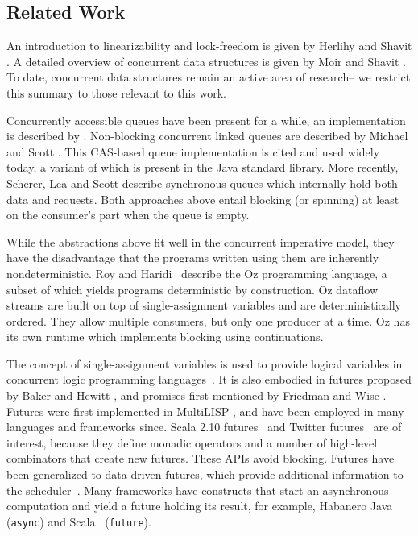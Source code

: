 \subsection{Related Work}

An introduction to linearizability and lock-freedom
is given by Herlihy and Shavit \cite{Herlihy08}.
A detailed overview of concurrent data structures is given
by Moir and Shavit \cite{Moir05}.
To date, concurrent data structures remain an active area of
research-- we restrict this summary to those relevant to this work.

Concurrently accessible queues have been present for a while,
an implementation is described by \cite{Mellor87}.
Non-blocking concurrent linked queues are described by Michael and
Scott \cite{Michael96}. This CAS-based
queue implementation is cited and used widely today, a variant of
which is present in the Java standard library.
More recently, Scherer, Lea and Scott \cite{SchererLS09} describe
synchronous queues which internally hold both data and requests.
Both approaches above entail blocking (or spinning) at least on the
consumer's part when the queue is empty.

While the abstractions above fit well in the concurrent imperative
model, they have the disadvantage that the programs written using them
are inherently nondeterministic.
Roy and Haridi~\cite{RoyH2004} describe the Oz programming language,
a subset of which yields programs deterministic by construction.
Oz dataflow streams are built on top of
single-assignment variables and are deterministically ordered.
They allow multiple consumers, but only one producer
at a time.
Oz has its own runtime which implements blocking using
continuations.

The concept of single-assignment variables is used to provide logical
variables in concurrent logic programming languages~\cite{Shapiro89}.
It is also embodied in
futures proposed by Baker and Hewitt \cite{Hewitt77}, and promises
first mentioned by Friedman and Wise \cite{Wise76}.
Futures were first implemented in MultiLISP \cite{Halstead85},
and have been employed in many languages and frameworks since.
Scala 2.10 futures~\cite{SIP14} and Twitter futures~\cite{TwitterFutures} are
of interest, because they define monadic operators and a
number of high-level combinators that create new futures.
These APIs avoid blocking.
Futures have been generalized to data-driven futures,
which provide additional information to the scheduler~\cite{Tasirlar11}.
Many frameworks have constructs that start an asynchronous
computation and yield a future holding its result, for example, Habanero Java~\cite{Shirako11} (\verb=async=)
and Scala~\cite{Odersky10} (\verb=future=).

